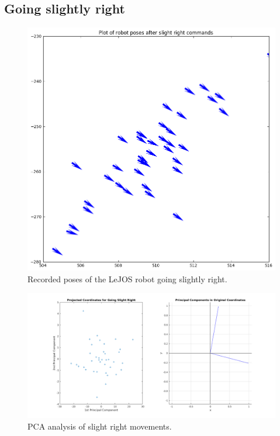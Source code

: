 \documentclass[paper=a4, fontsize=11pt]{scrartcl} %
\begin{document}
    \subsection{Going slightly right}
    \begin{figure}[H]
        \begin{center}
            \setlength{\fboxsep}{0.5pt} %
            \setlength{\fboxrule}{0.5pt}
            \includegraphics[width=12cm,fbox]{images/poses_plot_3_slightRight.png}
            \caption{Recorded poses of the LeJOS robot going slightly right.}
        \end{center}
    \end{figure}

    \begin{figure}[h!]
        \begin{center}
            \setlength{\fboxsep}{0.5pt} %
            \setlength{\fboxrule}{0.5pt}
            \includegraphics[width=\linewidth,fbox]{images/pca_slightRight.png}
            \caption{PCA analysis of slight right movements.}
        \end{center}
    \end{figure}
\end{document}
